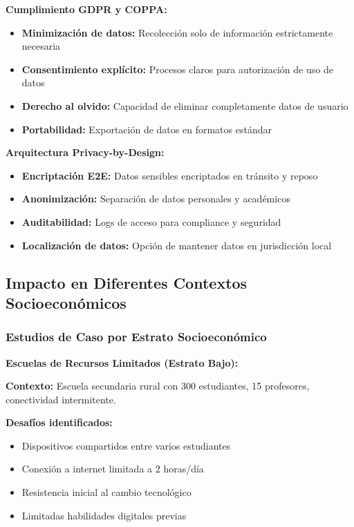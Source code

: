 \documentclass[12pt,a4paper]{report}
\begin{document}
\textbf{Cumplimiento GDPR y COPPA:}
\begin{itemize}
\item \textbf{Minimización de datos:} Recolección solo de información estrictamente necesaria
\item \textbf{Consentimiento explícito:} Procesos claros para autorización de uso de datos
\item \textbf{Derecho al olvido:} Capacidad de eliminar completamente datos de usuario
\item \textbf{Portabilidad:} Exportación de datos en formatos estándar
\end{itemize}

\textbf{Arquitectura Privacy-by-Design:}
\begin{itemize}
\item \textbf{Encriptación E2E:} Datos sensibles encriptados en tránsito y reposo
\item \textbf{Anonimización:} Separación de datos personales y académicos
\item \textbf{Auditabilidad:} Logs de acceso para compliance y seguridad
\item \textbf{Localización de datos:} Opción de mantener datos en jurisdicción local
\end{itemize}

\subsection{Impacto en Diferentes Contextos Socioeconómicos}

\subsubsection{Estudios de Caso por Estrato Socioeconómico}

\textbf{Escuelas de Recursos Limitados (Estrato Bajo):}

\textbf{Contexto:} Escuela secundaria rural con 300 estudiantes, 15 profesores, conectividad intermitente.

\textbf{Desafíos identificados:}
\begin{itemize}
\item Dispositivos compartidos entre varios estudiantes
\item Conexión a internet limitada a 2 horas/día
\item Resistencia inicial al cambio tecnológico
\item Limitadas habilidades digitales previas
\end{itemize}
\end{document}
